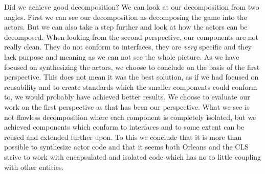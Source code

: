 Did we achieve good decomposition? We can look at our decomposition from two angles. First we can see our decomposition as decomposing the game into the actors. But we can also take a step further and look at how the actors can be decomposed. When looking from the second perspective, our components are not really clean. They do not conform to interfaces, they are \textit{very} specific and they lack purpose and meaning as we can not see the whole picture. As we have focused on synthesizing the actors, we choose to conclude on the basis of the first perspective. This does not mean it was the best solution, as if we had focused on reusability and to create standards which the smaller components could conform to, we would probably have achieved better results. We choose to evaluate our work on the first perspective as that has been our perspective. What we see is not flawless decomposition where each component is completely isolated, but we achieved components which conform to interfaces and to some extent can be reused and extended further upon. To this we conclude that it is more than possible to synthesize actor code and that it seems both Orleans and the CLS strive to work with encapsulated and isolated code which has no to little coupling with other entities.

